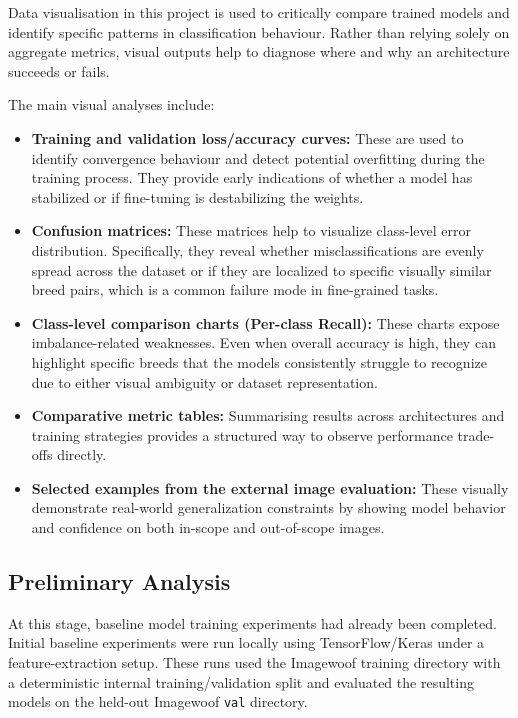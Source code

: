 \documentclass[12pt, a4paper]{article}
\begin{document}
Data visualisation in this project is used to critically compare trained models and identify specific patterns in classification behaviour. Rather than relying solely on aggregate metrics, visual outputs help to diagnose where and why an architecture succeeds or fails.

The main visual analyses include:

\begin{itemize}
  \item \textbf{Training and validation loss/accuracy curves:} These are used to identify convergence behaviour and detect potential overfitting during the training process. They provide early indications of whether a model has stabilized or if fine-tuning is destabilizing the weights.
  \item \textbf{Confusion matrices:} These matrices help to visualize class-level error distribution. Specifically, they reveal whether misclassifications are evenly spread across the dataset or if they are localized to specific visually similar breed pairs, which is a common failure mode in fine-grained tasks.
  \item \textbf{Class-level comparison charts (Per-class Recall):} These charts expose imbalance-related weaknesses. Even when overall accuracy is high, they can highlight specific breeds that the models consistently struggle to recognize due to either visual ambiguity or dataset representation.
  \item \textbf{Comparative metric tables:} Summarising results across architectures and training strategies provides a structured way to observe performance trade-offs directly.
  \item \textbf{Selected examples from the external image evaluation:} These visually demonstrate real-world generalization constraints by showing model behavior and confidence on both in-scope and out-of-scope images.
\end{itemize}

\subsection{Preliminary Analysis}

At this stage, baseline model training experiments had already been completed. Initial baseline experiments were run locally using TensorFlow/Keras under a feature-extraction setup. These runs used the Imagewoof training directory with a deterministic internal training/validation split and evaluated the resulting models on the held-out Imagewoof \texttt{val} directory.
\end{document}
